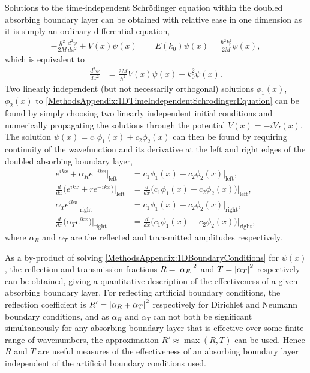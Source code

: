 Solutions to the time-independent Schrödinger equation within the doubled absorbing boundary layer can be obtained with relative ease in one dimension as it is simply an ordinary differential equation,
\begin{align}
    -\frac{\hbar^2}{2M}\frac{d^2 \psi}{dx^2} + V(x) \psi(x) &= E(k_0) \psi(x) = \frac{\hbar^2 k_0^2}{2M} \psi(x),
\end{align}
which is equivalent to
\begin{align}
    \frac{d^2 \psi}{dx^2} &= \frac{2 M}{\hbar^2} V(x) \psi(x) - k_0^2 \psi(x).
    \label{MethodsAppendix:1DTimeIndependentSchrodingerEquation}
\end{align}
Two linearly independent (but not necessarily orthogonal) solutions $\phi_1(x)$, $\phi_2(x)$ to \eqref{MethodsAppendix:1DTimeIndependentSchrodingerEquation} can be found by simply choosing two linearly independent initial conditions and numerically propagating the solutions through the potential $V(x) = -i V_I(x)$. The solution $\psi(x) = c_1 \phi_1(x) + c_2 \phi_2(x)$ can then be found by requiring continuity of the wavefunction and its derivative at the left and right edges of the doubled absorbing boundary layer,
\begin{subequations}
    \label{MethodsAppendix:1DBoundaryConditions}
    \begin{align}
        e^{i k x} + \alpha_R e^{-i k x} \Big|_\text{left} &=  c_1 \phi_1(x) + c_2 \phi_2(x) \Big|_\text{left}, \\
        \frac{d}{dx}\big( e^{i k x} + r e^{-i k x}\big) \Big|_\text{left} &=  \frac{d}{dx} \big( c_1 \phi_1(x) + c_2 \phi_2(x) \big) \Big|_\text{left},\\
        \alpha_T e^{i k x} \Big|_\text{right} &= c_1 \phi_1(x) + c_2 \phi_2(x) \Big|_\text{right}, \\
        \frac{d}{dx} \big( \alpha_T e^{i k x} \big) \Big|_\text{right} &= \frac{d}{dx} \big( c_1 \phi_1(x) + c_2 \phi_2(x) \big) \Big|_\text{right},
    \end{align}
\end{subequations}
where $\alpha_R$ and $\alpha_T$ are the reflected and transmitted amplitudes respectively. 

As a by-product of solving \eqref{MethodsAppendix:1DBoundaryConditions} for $\psi(x)$, the reflection and transmission fractions $R=\left|\alpha_R\right|^2$ and $T=\left|\alpha_T\right|^2$ respectively can be obtained, giving a quantitative description of the effectiveness of a given absorbing boundary layer. For reflecting artificial boundary conditions, the reflection coefficient is $R'= \left|\alpha_R \mp \alpha_T\right|^2$ respectively for Dirichlet and Neumann boundary conditions, and as $\alpha_R$ and $\alpha_T$ can not both be significant simultaneously for any absorbing boundary layer that is effective over some finite range of wavenumbers, the approximation $R' \approx \max(R, T)$ can be used.  Hence $R$ and $T$ are useful measures of the effectiveness of an absorbing boundary layer independent of the artificial boundary conditions used.


